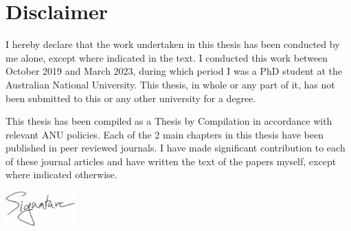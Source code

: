 \section*{Disclaimer}

I hereby declare that the work undertaken in this thesis has been conducted by me alone, except where indicated in the text. I conducted this work between October 2019 and March 2023, during which period I was a PhD student at the Australian National University. This thesis, in whole or any part of it, has not been submitted to this or any other university for a degree.

This thesis has been compiled as a Thesis by Compilation in accordance with relevant ANU policies. Each of the 2 main chapters in this thesis have been published in peer reviewed journals. I have made significant contribution to each of these journal articles and have written the text of the papers myself, except where indicated otherwise.

\vspace{1cm}
\begin{flushright}
	\includegraphics[width=0.2\textwidth]{signature.pdf}\\[2mm]
	\fullname
	
	\fullthesisdate
\end{flushright}

